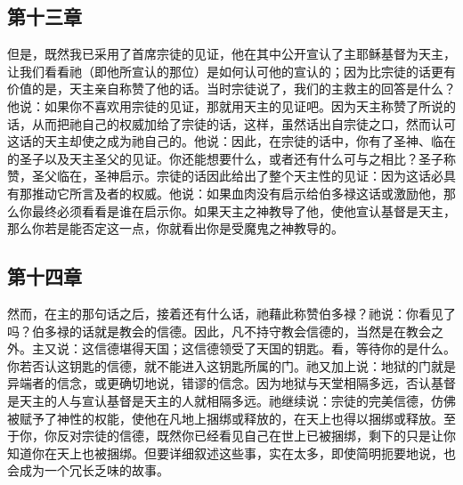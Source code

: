 
\subsection{第十三章}

\par

但是，既然我已采用了首席宗徒的见证，他在其中公开宣认了主耶稣基督为天主，让我们看看祂（即他所宣认的那位）是如何认可他的宣认的；因为比宗徒的话更有价值的是，天主亲自称赞了他的话。当时宗徒说了，我们的主救主的回答是什么？他说：如果你不喜欢用宗徒的见证，那就用天主的见证吧。因为天主称赞了所说的话，从而把祂自己的权威加给了宗徒的话，这样，虽然话出自宗徒之口，然而认可这话的天主却使之成为祂自己的。他说：因此，在宗徒的话中，你有了圣神、临在的圣子以及天主圣父的见证。你还能想要什么，或者还有什么可与之相比？圣子称赞，圣父临在，圣神启示。宗徒的话因此给出了整个天主性的见证：因为这话必具有那推动它所言及者的权威。他说：如果血肉没有启示给伯多禄这话或激励他，那么你最终必须看看是谁在启示你。如果天主之神教导了他，使他宣认基督是天主，那么你若是能否定这一点，你就看出你是受魔鬼之神教导的。\par


\subsection{第十四章}

\par

然而，在主的那句话之后，接着还有什么话，祂藉此称赞伯多禄？祂说：你看见了吗？伯多禄的话就是教会的信德。因此，凡不持守教会信德的，当然是在教会之外。主又说：这信德堪得天国；这信德领受了天国的钥匙。看，等待你的是什么。你若否认这钥匙的信德，就不能进入这钥匙所属的门。祂又加上说：地狱的门就是异端者的信念，或更确切地说，错谬的信念。因为地狱与天堂相隔多远，否认基督是天主的人与宣认基督是天主的人就相隔多远。祂继续说：宗徒的完美信德，仿佛被赋予了神性的权能，使他在凡地上捆绑或释放的，在天上也得以捆绑或释放。至于你，你反对宗徒的信德，既然你已经看见自己在世上已被捆绑，剩下的只是让你知道你在天上也被捆绑。但要详细叙述这些事，实在太多，即使简明扼要地说，也会成为一个冗长乏味的故事。\par

